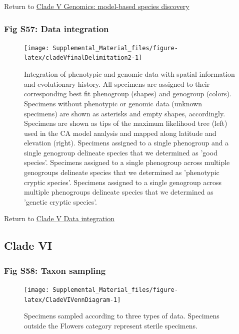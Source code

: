 \documentclass[
  11pt,
]{article}
\begin{document}
Return to \protect\hyperlink{model-based-species-discovery-9}{Clade V Genomics: model-based species discovery}
\pagebreak

\hypertarget{fig-s57-data-integration}{%
\subsubsection{Fig S57: Data integration}\label{fig-s57-data-integration}}

\begin{figure}
\texttt{[image: Supplemental\_Material\_files/figure-latex/cladeVfinalDelimitation2-1]} \caption{Integration of phenotypic and genomic data with spatial information and evolutionary history. All specimens are assigned to their corresponding best fit phenogroup (shapes) and genogroup (colors). Specimens without phenotypic or genomic data (unknown specimens) are shown as asterisks and empty shapes, accordingly. Specimens are shown as tips of the maximum likelihood tree (left) used in the CA model analysis and mapped along latitude and elevation (right). Specimens assigned to a single phenogroup and a single genogroup delineate species that we determined as 'good species'. Specimens assigned to a single phenogroup across multiple genogroups delineate species that we determined as 'phenotypic cryptic species'. Specimens assigned to a single genogroup across multiple phenogroups delineate species that we determined as 'genetic cryptic species'.}\label{fig:cladeVfinalDelimitation2}
\end{figure}

Return to \protect\hyperlink{data-integration-5}{Clade V Data integration}
\pagebreak

\hypertarget{clade-vi-2}{%
\subsection{Clade VI}\label{clade-vi-2}}

\hypertarget{fig-s58-taxon-sampling}{%
\subsubsection{Fig S58: Taxon sampling}\label{fig-s58-taxon-sampling}}

\begin{figure}

{\centering \texttt{[image: Supplemental\_Material\_files/figure-latex/CladeVIVennDiagram-1]} 

}

\caption{Specimens sampled according to three types of data. Specimens outside the Flowers category represent sterile specimens.}\label{fig:CladeVIVennDiagram}
\end{figure}
\end{document}
